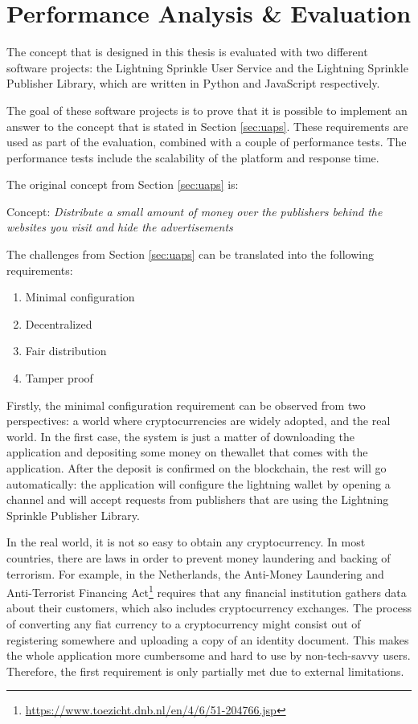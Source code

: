 \chapter{Performance Analysis \& Evaluation}
\label{cha:evaluation}

The concept that is designed in this thesis is evaluated with two different software projects: the Lightning Sprinkle User Service and the Lightning Sprinkle Publisher Library, which are written in Python and JavaScript respectively. 

The goal of these software projects is to prove that it is possible to implement an answer to the concept that is stated in Section \ref{sec:uaps}. These requirements are used as part of the evaluation, combined with a couple of performance tests. The performance tests include the scalability of the platform and response time. 

\noindent The original concept from Section \ref{sec:uaps} is:

\vspace{1em}

Concept: \textit{Distribute a small amount of money over the publishers behind the websites you visit and hide the advertisements}

\vspace{1em}

\noindent The challenges from Section \ref{sec:uaps} can be translated into the following requirements:
\begin{enumerate}
  \item Minimal configuration
  \item Decentralized
  \item Fair distribution
  \item Tamper proof
\end{enumerate}

Firstly, the minimal configuration requirement can be observed from two perspectives: a world where cryptocurrencies are widely adopted, and the real world. In the first case, the system is just a matter of downloading the application and depositing some money on thewallet that comes with the application. After the deposit is confirmed on the blockchain, the rest will go automatically: the application will configure the lightning wallet by opening a channel and will accept requests from publishers that are using the Lightning Sprinkle Publisher Library. 

In the real world, it is not so easy to obtain any cryptocurrency. In most countries, there are laws in order to prevent money laundering and backing of terrorism. For example, in the Netherlands, the Anti-Money Laundering and Anti-Terrorist Financing Act\footnote{\url{https://www.toezicht.dnb.nl/en/4/6/51-204766.jsp}} requires that any financial institution gathers data about their customers, which also includes cryptocurrency exchanges. The process of converting any fiat currency to a cryptocurrency might consist out of registering somewhere and uploading a copy of an identity document. This makes the whole application more cumbersome and hard to use by non-tech-savvy users. Therefore, the first requirement is only partially met due to external limitations.

